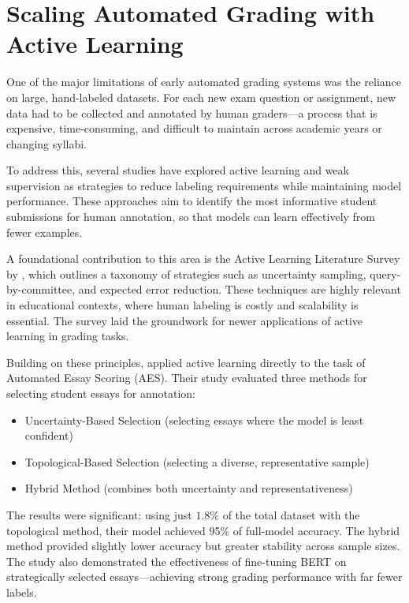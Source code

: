 \section{Scaling Automated Grading with Active Learning}
One of the major limitations of early automated grading systems was the reliance on large, hand-labeled datasets. For each new exam question or assignment, new data had to be collected and annotated by human graders—a process that is expensive, time-consuming, and difficult to maintain across academic years or changing syllabi.

To address this, several studies have explored active learning and weak supervision as strategies to reduce labeling requirements while maintaining model performance. These approaches aim to identify the most informative student submissions for human annotation, so that models can learn effectively from fewer examples.

A foundational contribution to this area is the Active Learning Literature Survey by \citet{settles2010}, which outlines a taxonomy of strategies such as uncertainty sampling, query-by-committee, and expected error reduction. These techniques are highly relevant in educational contexts, where human labeling is costly and scalability is essential. The survey laid the groundwork for newer applications of active learning in grading tasks.

Building on these principles, \citet{firoozi2023} applied active learning directly to the task of Automated Essay Scoring (AES). Their study evaluated three methods for selecting student essays for annotation:

\begin{itemize}
  \item Uncertainty-Based Selection (selecting essays where the model is least confident)
  \item Topological-Based Selection (selecting a diverse, representative sample)
  \item Hybrid Method (combines both uncertainty and representativeness)
\end{itemize}

The results were significant: using just $1.8\%$ of the total dataset with the topological method, their model achieved 95\% of full-model accuracy. The hybrid method provided slightly lower accuracy but greater stability across sample sizes. The study also demonstrated the effectiveness of fine-tuning BERT on strategically selected essays—achieving strong grading performance with far fewer labels.

